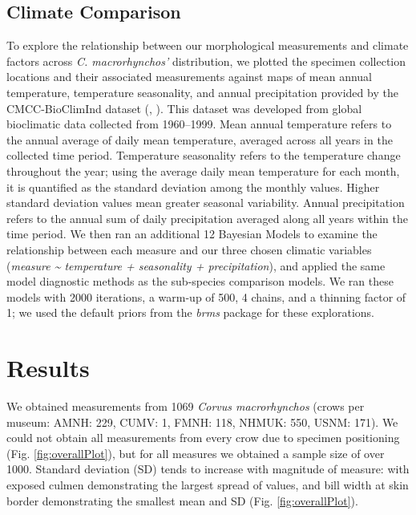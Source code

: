 \documentclass[10pt,a4paper]{article}
\begin{document}
\subsection{Climate Comparison}\label{climate-comparison}

To explore the relationship between our morphological measurements and climate factors across \emph{C. macrorhynchos'} distribution, we plotted the specimen collection locations and their associated measurements against maps of mean annual temperature, temperature seasonality, and annual precipitation provided by the CMCC-BioClimInd dataset (, ).
This dataset was developed from global bioclimatic data collected from 1960--1999.
Mean annual temperature refers to the annual average of daily mean temperature, averaged across all years in the collected time period.
Temperature seasonality refers to the temperature change throughout the year; using the average daily mean temperature for each month, it is quantified as the standard deviation among the monthly values.
Higher standard deviation values mean greater seasonal variability.
Annual precipitation refers to the annual sum of daily precipitation averaged along all years within the time period.
We then ran an additional 12 Bayesian Models to examine the relationship between each measure and our three chosen climatic variables (\emph{measure \textasciitilde{} temperature + seasonality + precipitation}), and applied the same model diagnostic methods as the sub-species comparison models.
We ran these models with 2000 iterations, a warm-up of 500, 4 chains, and a thinning factor of 1; we used the default priors from the \emph{brms} package for these explorations.

\section{Results}\label{results}

We obtained measurements from 1069 \emph{Corvus macrorhynchos} (crows per museum: AMNH: 229, CUMV: 1, FMNH: 118, NHMUK: 550, USNM: 171).
We could not obtain all measurements from every crow due to specimen positioning (Fig. \ref{fig:overallPlot}), but for all measures we obtained a sample size of over 1000.
Standard deviation (SD) tends to increase with magnitude of measure: with exposed culmen demonstrating the largest spread of values, and bill width at skin border demonstrating the smallest mean and SD (Fig. \ref{fig:overallPlot}).
\end{document}
